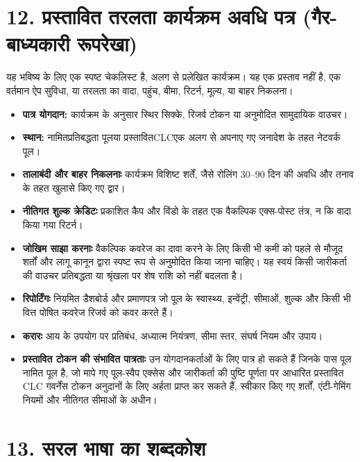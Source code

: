 \documentclass[11pt]{article}
\begin{document}
\section*{12. प्रस्तावित तरलता कार्यक्रम अवधि पत्र (गैर-बाध्यकारी रूपरेखा)}

यह भविष्य के लिए एक स्पष्ट चेकलिस्ट है, अलग से प्रलेखित कार्यक्रम। यह एक प्रस्ताव नहीं है, एक वर्तमान ऐप सुविधा, या तरलता का वादा, पहुंच, बीमा, रिटर्न, मूल्य, या बाहर निकलना।

\begin{itemize}[leftmargin=*]
\item \textbf{पात्र योगदान:} कार्यक्रम के अनुसार स्थिर सिक्के, रिजर्व टोकन या अनुमोदित सामुदायिक वाउचर।
\item \textbf{स्थान:} नामितप्रतिबद्धता पूलया प्रस्तावितCLCएक अलग से अपनाए गए जनादेश के तहत नेटवर्क पूल।
\item \textbf{तालाबंदी और बाहर निकलनाः} कार्यक्रम विशिष्ट शर्तें, जैसे रोलिंग 30--90 दिन की अवधि और तनाव के तहत खुलासे किए गए द्वार।
\item \textbf{नीतिगत शुल्क क्रेडिटः} प्रकाशित कैप और विंडो के तहत एक वैकल्पिक एक्स-पोस्ट तंत्र, न कि वादा किया गया रिटर्न।
\item \textbf{जोखिम साझा करनाः} वैकल्पिक कवरेज का दावा करने के लिए किसी भी कमी को पहले से मौजूद शर्तों और लागू कानून द्वारा स्पष्ट रूप से अनुमोदित किया जाना चाहिए। यह स्वयं किसी जारीकर्ता की वाउचर प्रतिबद्धता या श्रृंखला पर शेष राशि को नहीं बदलता है।
\item \textbf{रिपोर्टिंगः} नियमित डैशबोर्ड और प्रमाणपत्र जो पूल के स्वास्थ्य, इन्वेंट्री, सीमाओं, शुल्क और किसी भी वित्त पोषित कवरेज रिजर्व को कवर करते हैं।
\item \textbf{करारः} आय के उपयोग पर प्रतिबंध, अध्यात्म नियंत्रण, सीमा स्तर, संघर्ष नियम और उपाय।
\item \textbf{प्रस्तावित टोकन की संभावित पात्रताः} उन योगदानकर्ताओं के लिए पात्र हो सकते हैं जिनके पास पूल नामित पूल है, जो मापे गए पूल-स्वैप एक्सेस और जारीकर्ता की पुष्टि पूर्णता पर आधारित प्रस्तावित CLC गवर्नेंस टोकन अनुदानों के लिए अर्हता प्राप्त कर सकते हैं, स्वीकार किए गए शर्तों, एंटी-गेमिंग नियमों और नीतिगत सीमाओं के अधीन।
\end{itemize}


\section*{13. सरल भाषा का शब्दकोश}
\end{document}
